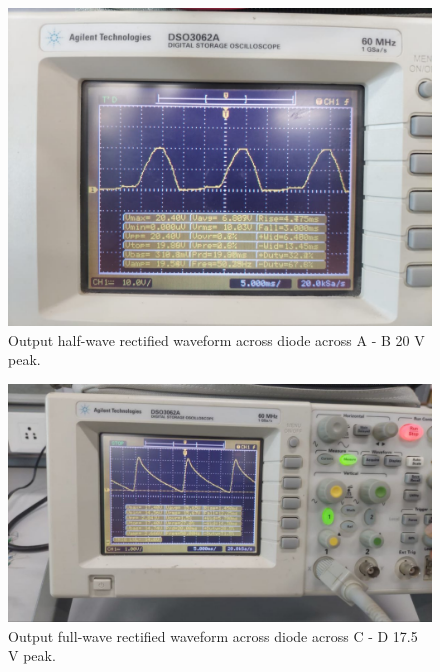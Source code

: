 \documentclass[journal,12pt,twocolumn]{IEEEtran}
\begin{document}
	
\begin{figure}[!ht]
	\includegraphics[width=\columnwidth]{figs/hwrect.jpg}
  \caption{Output half-wave rectified waveform across diode across A - B 20 V peak.}
	\label{fig:hwrect}
\end{figure}
	\begin{figure}[!ht]
		\includegraphics[width=\columnwidth]{figs/rectified.jpg}
		\caption{Output full-wave rectified waveform across diode across C - D 17.5 V peak.}
		\label{fig:rectifier}
	\end{figure}
	
\end{document}

